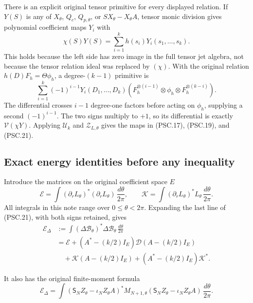 There is an explicit original tensor primitive for every displayed relation. If \(Y(S)\) is any of \(X_\theta\), \(Q_c\), \(Q_{p,\theta}\), or \(SX_\theta-X_\theta A\), tensor monic division gives polynomial coefficient maps \(Y_i\) with
\[
 \chi(S)Y(S)=\sum_{i=1}^k h(s_i)Y_i(s_1,\ldots,s_k).
\]
This holds because the left side has zero image in the full tensor jet algebra, not because the tensor relation ideal was replaced by \((\chi)\). With the original relation
\(h(D)F_h=\Theta\phi_h\), a degree-\((k-1)\) primitive is
\[
 \sum_{i=1}^k(-1)^{i-1}Y_i(D_1,\ldots,D_k)
 \left(F_h^{\otimes(i-1)}\otimes\phi_h
       \otimes F_h^{\otimes(k-i)}\right).
 \tag{PSC.22}
\]
The differential crosses \(i-1\) degree-one factors before acting on \(\phi_h\), supplying a second \((-1)^{i-1}\). The two signs multiply to \(+1\), so its differential is exactly
\(\mathcal V(\chi Y)\). Applying \(\mathcal U_k\) and \(\mathcal Z_{L,\theta}\) gives the maps in (PSC.17), (PSC.19), and (PSC.21).

\subsection{Exact energy identities before any inequality}

Introduce the matrices on the original coefficient space \(E\)
\[
 \mathscr E
 =\int(\partial_rL_\theta)^*(\partial_rL_\theta)
       \,\frac{d\theta}{2\pi},\qquad
 \mathscr K
 =\int(\partial_rL_\theta)^*L_\theta
       \,\frac{d\theta}{2\pi}.
 \tag{PSC.23}
\]
All integrals in this note range over \(0\leq\theta<2\pi\).
Expanding the last line of (PSC.21), with both signs retained, gives
\[
 \begin{aligned}
 \mathscr E_\Delta
 &:=\int(\Delta\mathscr B_\theta)^*
             \Delta\mathscr B_\theta\,\frac{d\theta}{2\pi}\\
 &=\mathscr E+
   (A^*-(k/2)I_E)\mathscr D(A-(k/2)I_E)\\
 &\quad+\mathscr K(A-(k/2)I_E)
       +(A^*-(k/2)I_E)\mathscr K^* .
 \end{aligned}
 \tag{PSC.24}
\]

It also has the original finite-moment formula
\[
 \mathscr E_\Delta
 =\int
  (\mathsf S_NZ_\theta-\iota_NZ_\theta A)^*
  M_{N+1,\theta}
  (\mathsf S_NZ_\theta-\iota_NZ_\theta A)
  \,\frac{d\theta}{2\pi}.
 \tag{PSC.25}
\]

